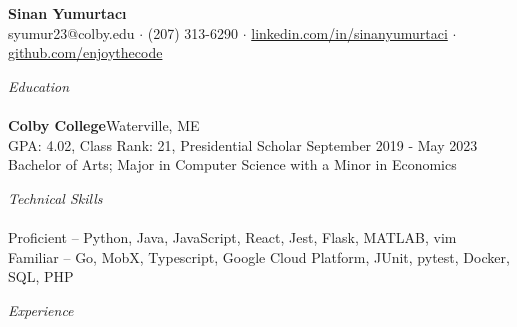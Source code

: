 \documentclass[letterpaper]{article}
\newcommand{\lineunder} {
    \vspace*{-8pt} \\
    \hspace*{-3pt} \hrulefill \\
}
\newcommand{\header} [1] {
	{\hspace*{-3pt}\vspace*{6pt} \textit{#1}}
    \vspace*{-6pt} \lineunder
}
\begin{document}
\vspace*{-40pt}


\vspace*{-10pt}
\begin{center}
	{\Large \textbf {Sinan Yumurtacı}}\\
	 syumur23@colby.edu $\cdot$ (207) 313-6290 $\cdot$
  \href{https://linkedin.com/in/sinanyumurtaci}{linkedin.com/in/sinanyumurtaci} $\cdot$ 
  \href{https://github.com/enjoythecode}{github.com/enjoythecode}

  
\end{center}




\header{Education}
\textbf{Colby College}\hfill Waterville, ME\\
GPA: 4.02, Class Rank: 21, Presidential Scholar \hfill September 2019 - May 2023\\
Bachelor of Arts; Major in Computer Science with a Minor in Economics \\
\vspace{2mm}



\header{Technical Skills}

Proficient -- Python, Java, JavaScript, React, Jest, Flask, MATLAB, vim\\
Familiar\hspace{2.42mm} -- Go, MobX, Typescript, Google Cloud Platform, JUnit, pytest, Docker, SQL, PHP\\
\vspace{2mm}

\header{Experience}
\vspace{-1mm}
\end{document}
